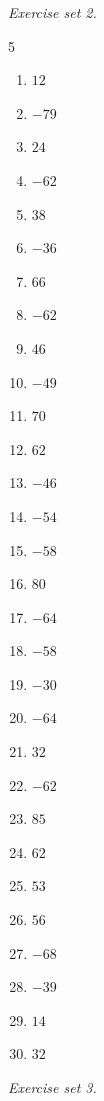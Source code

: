 \par\noindent\emph{Exercise set 2.}\nopagebreak
\begin{multicols}{5}\raggedright
\begin{enumerate}[label=\arabic*., leftmargin=*, itemsep=1pt]
\item $12$
\item $-79$
\item $24$
\item $-62$
\item $38$
\item $-36$
\item $66$
\item $-62$
\item $46$
\item $-49$
\item $70$
\item $62$
\item $-46$
\item $-54$
\item $-58$
\item $80$
\item $-64$
\item $-58$
\item $-30$
\item $-64$
\item $32$
\item $-62$
\item $85$
\item $62$
\item $53$
\item $56$
\item $-68$
\item $-39$
\item $14$
\item $32$
\end{enumerate}
\end{multicols}
\par\noindent\emph{Exercise set 3.}\nopagebreak
